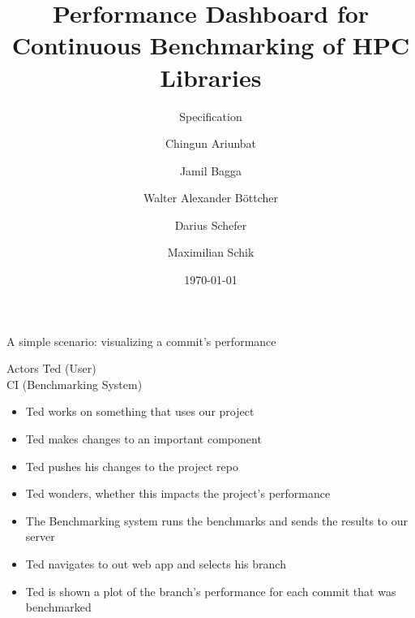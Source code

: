 \documentclass[pdf]{beamer}
\title{Performance Dashboard for Continuous Benchmarking of HPC Libraries}
\subtitle{Specification}
\author{Chingun Ariunbat \and Jamil Bagga \and Walter Alexander Böttcher \and Darius Schefer \and Maximilian Schik}
\date{\today}
\begin{document}
\begin{frame}
    \titlepage
\end{frame}

\begin{frame}{A simple scenario: visualizing a commit's performance}
  \begin{block}{Actors}
    Ted (User)\\
    CI (Benchmarking System)
  \end{block}\pause
  \begin{itemize}
    \item Ted works on something that uses our project\pause
    \item Ted makes changes to an important component\pause
    \item Ted pushes his changes to the project repo\pause
    \item Ted wonders, whether this impacts the project's performance\pause
    \item The Benchmarking system runs the benchmarks and sends the results to our server\pause
    \item Ted navigates to out web app and selects his branch\pause
    \item Ted is shown a plot of the branch's performance for each commit that was benchmarked
  \end{itemize}
\end{frame}
\end{document}
